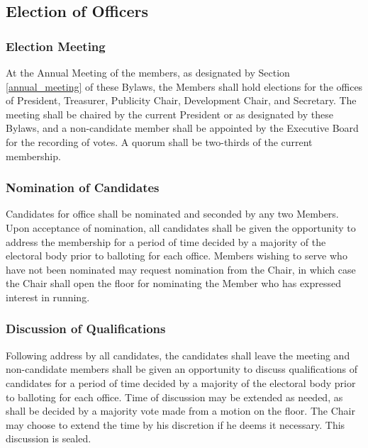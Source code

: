 \documentclass{article}
\begin{document}
\subsection{Election of Officers} \label{elections}

\subsubsection{Election Meeting}

At the Annual Meeting of the members, as designated by Section
\ref{annual_meeting} of these Bylaws, the Members shall hold elections for the
offices of President, Treasurer, Publicity Chair, Development Chair, and
Secretary. The meeting shall be chaired by the current President or as
designated by these Bylaws, and a non-candidate member shall be appointed by the
Executive Board for the recording of votes. A quorum shall be two-thirds of the
current membership.

\subsubsection{Nomination of Candidates}

Candidates for office shall be nominated and seconded by any two Members.
Upon acceptance of nomination, all candidates shall be given the opportunity
to address the membership for a period of time decided by a majority
of the electoral body prior to balloting for each office. Members
wishing to serve who have not been nominated may request nomination
from the Chair, in which case the Chair shall open the floor for nominating
the Member who has expressed interest in running.

\subsubsection{Discussion of Qualifications}

Following address by all candidates, the candidates shall leave the meeting and
non-candidate members shall be given an opportunity to discuss qualifications of
candidates for a period of time decided by a majority of the electoral body
prior to balloting for each office. Time of discussion may be extended as
needed, as shall be decided by a majority vote made from a motion on the
floor. The Chair may choose to extend the time by his discretion if he deems it
necessary. This discussion is sealed.
\end{document}
